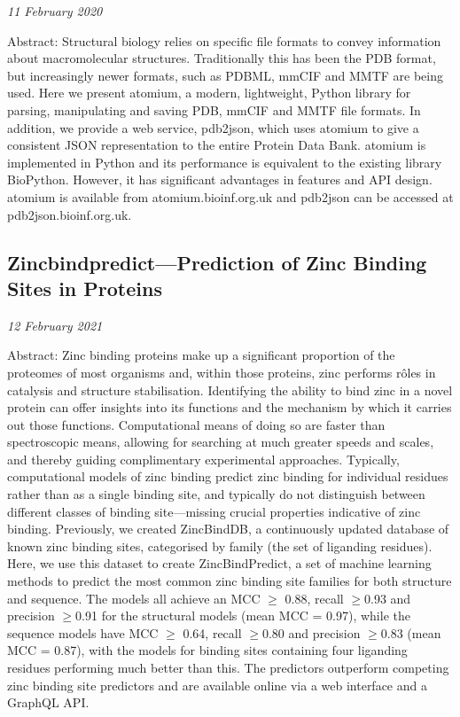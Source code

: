 \emph{11 February 2020}

Abstract: Structural biology relies on specific file formats to convey information about macromolecular structures. Traditionally this has been the PDB format, but increasingly newer formats, such as PDBML, mmCIF and MMTF are being used. Here we present atomium, a modern, lightweight, Python library for parsing, manipulating and saving PDB, mmCIF and MMTF file formats. In addition, we provide a web service, pdb2json, which uses atomium to give a consistent JSON representation to the entire Protein Data Bank. atomium is implemented in Python and its performance is equivalent to the existing library BioPython. However, it has significant advantages in features and API design. atomium is available from atomium.bioinf.org.uk and pdb2json can be accessed at pdb2json.bioinf.org.uk.


\subsection{Zincbindpredict—Prediction of Zinc Binding Sites in Proteins}

\emph{12 February 2021}

Abstract: Zinc binding proteins make up a significant proportion of the proteomes of most organisms and, within those proteins, zinc performs rôles in catalysis and structure stabilisation. Identifying the ability to bind zinc in a novel protein can offer insights into its functions and the mechanism by which it carries out those functions. Computational means of doing so are faster than spectroscopic means, allowing for searching at much greater speeds and scales, and thereby guiding complimentary experimental approaches. Typically, computational models of zinc binding predict zinc binding for individual residues rather than as a single binding site, and typically do not distinguish between different classes of binding site—missing crucial properties indicative of zinc binding. Previously, we created ZincBindDB, a continuously updated database of known zinc binding sites, categorised by family (the set of liganding residues). Here, we use this dataset to create ZincBindPredict, a set of machine learning methods to predict the most common zinc binding site families for both structure and sequence. The models all achieve an MCC $\ge$ 0.88, recall $\ge$0.93 and precision $\ge$0.91 for the structural models (mean MCC = 0.97), while the sequence models have MCC $\ge$ 0.64, recall $\ge$0.80 and precision $\ge$0.83 (mean MCC = 0.87), with the models for binding sites containing four liganding residues performing much better than this. The predictors outperform competing zinc binding site predictors and are available online via a web interface and a GraphQL API.


